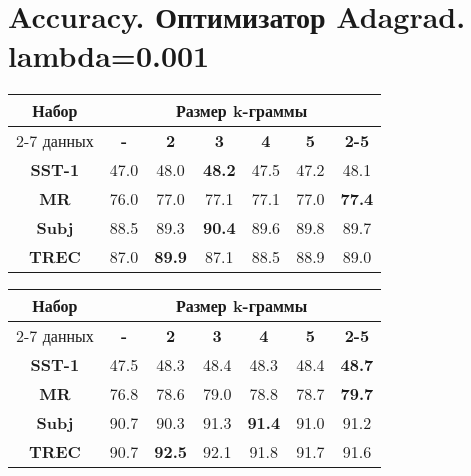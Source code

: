 
\chapter{Accuracy. Оптимизатор Adagrad. lambda=0.001}

\begin{minipage}{\linewidth}
\begin{center}
 \label{tab:title} 
\begin{tabular}{|c|c|c|c|c|c|c|}
\hline
\multirow{2}{*}{Набор}   &         \multicolumn{6}{c|}{Размер k-граммы} \\ \cline{2-7} 
     данных              & \textbf{-} & \textbf{2} & \textbf{3} & \textbf{4} & \textbf{5} & \textbf{2-5} \\ \hline
\textbf{SST-1}           &  47.0    & 48.0     &\textbf{48.2}&47.5&  47.2    & 48.1           \\  \hline
\textbf{MR}              &  76.0    & 77.0     & 77.1         & 77.1   & 77.0     & \textbf{77.4} \\ \hline
\textbf{Subj}            &  88.5    & 89.3     & \textbf{90.4}& 89.6   & 89.8 & 89.7 \\ \hline
\textbf{TREC}            &  87.0    & \textbf{89.9} & 87.1& 88.5   &  88.9  & 89.0  \\ \hline
\end{tabular}
\vspace{5mm}
\end{center}
\end{minipage}

\vspace{5mm}
\begin{minipage}{\linewidth}
\begin{center}
 \label{tab:title} 
\begin{tabular}{|c|c|c|c|c|c|c|}
\hline
\multirow{2}{*}{Набор}   &                \multicolumn{6}{c|}{Размер k-граммы} \\ \cline{2-7} 
     данных              & \textbf{-} & \textbf{2} & \textbf{3} & \textbf{4} & \textbf{5} & \textbf{2-5} \\ \hline
\textbf{SST-1}           & 47.5     &  48.3    & 48.4    & 48.3     & 48.4     & \textbf{48.7}  \\ \hline
\textbf{MR}              & 76.8     &  78.6    & 79.0    & 78.8     & 78.7     & \textbf{79.7} \\\hline
\textbf{Subj}            & 90.7     &  90.3    & 91.3    &\textbf{91.4}& 91.0  &  91.2 \\\hline
\textbf{TREC}            & 90.7     &  \textbf{92.5}     & 92.1     & 91.8     & 91.7     &  91.6 \\\hline
\end{tabular}
\end{center}
\end{minipage}

